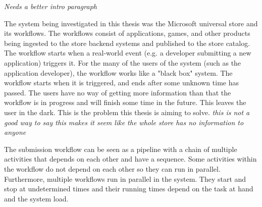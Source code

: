 \documentclass[english,12pt,a4paper,pdftex,sci,utf8]{aaltothesis}
\newcommand{\nyi}[1]{\colorbox{nyibg}{\textcolor{nyitext}{\emph{#1}}}}
\begin{document}








\nyi{Needs a better intro paragraph}

The system being investigated in this thesis was the Microsoft universal store and its workflows. 
The workflows consist of applications, games, and other products being ingested to the store backend systems and published to the store catalog.
The workflow starts when a real-world event (e.g. a developer submitting a new application) triggers it.
For the many of the users of the system (such as the application developer), the workflow works 
like a "black box" system. The workflow starts when it is triggered, and ends after some unknown time has passed.
The users have no way of getting more information than that the workflow is in progress and will finish some time 
in the future. This leaves the user in the dark. This is the problem this thesis is aiming to solve. 
\nyi{this is not a good way to say this}
\nyi{makes it seem like the whole store has no information to anyone}

The submission workflow can be seen as a pipeline with a chain of multiple activities that depends on each other and have a sequence. 
Some activities within the workflow do not depend on each other so they can run in parallel.
Furthermore, multiple workflows run in parallel in the system.
They start and stop at undetermined times and their running times depend on the task at hand and the system load.\\
\end{document}
